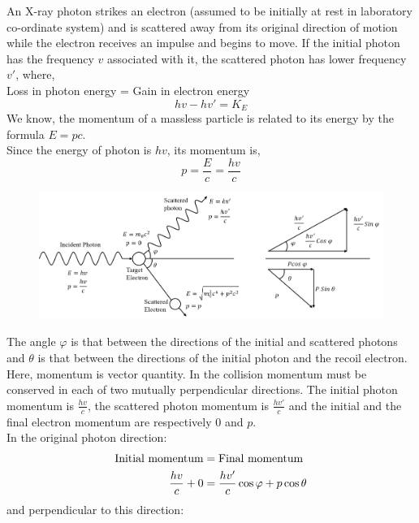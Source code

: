 \documentclass[../main.tex]{subfiles}
\begin{document}
    An X-ray photon strikes an electron (assumed to be initially at rest in laboratory co-ordinate system) and is scattered away from its original direction of motion while the electron receives an impulse and begins to move. If the initial photon has the frequency $ v $ associated with it, the scattered photon has lower frequency $ v' $, where,\\
    \indent Loss in photon energy = Gain in electron energy
    \begin{equation}
        hv-hv'=K_E \label{eq:comex1}
    \end{equation}
    We know, the momentum of a massless particle is related to its energy by the formula $ E=pc $.\\
    Since the energy of photon is $ hv $, its momentum is,
    \begin{equation}
        p=\frac{E}{c}=\frac{hv}{c}\label{eq:comex2}
    \end{equation}
    \begin{figure}[ht]
        \centering
        \includegraphics[scale=.75]{compton-experi.png}
    \end{figure}
    The angle $ \varphi $ is that between the directions of the initial and scattered photons and $ \theta $ is that between the directions of the initial photon and the recoil electron.\\
    Here, momentum is vector quantity. In the collision momentum must be conserved in each of two mutually perpendicular directions. The initial photon momentum is $ \frac{hv}{c} $, the scattered photon momentum is $ \frac{hv'}{c} $ and the initial and the final electron momentum are respectively $ 0 $ and $ p $.\\
    In the original photon direction:
    \begin{align}
        \text{Initial momentum} &= \text{Final momentum}\notag\\
        \frac{hv}{c}+0& =\frac{hv'}{c}\cos \varphi+p\cos\theta \label{eq:comex3}
    \end{align}
    and perpendicular to this direction:
\end{document}
